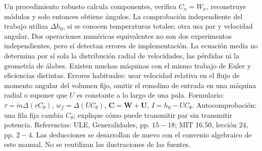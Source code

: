 \documentclass[10pt,openany]{book}
\begin{document}
Un procedimiento robusto calcula componentes, verifica \(C_x=W_x\), reconstruye módulos y solo entonces obtiene ángulos. La comprobación independiente del trabajo utiliza \(\Delta h_0\), si se conocen temperaturas totales; otra usa par y velocidad angular. Dos operaciones numéricas equivalentes no son dos experimentos independientes, pero sí detectan errores de implementación.
La ecuación media no determina por sí sola la distribución radial de velocidades, las pérdidas ni la geometría de álabes. Existen muchas máquinas con el mismo trabajo de Euler y eficiencias distintas. Errores habituales: usar velocidad relativa en el flujo de momento angular del volumen fijo, omitir el remolino de entrada en una máquina radial o suponer que \(U\) es constante a lo largo de una pala.
Formulario: \(\tau=\dot m\Delta(rC_\theta)\), \(w_f=\Delta(UC_\theta)\), \(\mathbf C=\mathbf W+\mathbf U\), \(I=h_0-UC_\theta\). Autocomprobación: una fila fija cambia \(C_\theta\); explique cómo puede transmitir par sin transmitir potencia.
Referencias: ULE, Generalidades, pp. \(15-18\); MIT 16.50, lección 24, pp. \(2-4\). Las deducciones se desarrollan de nuevo con el convenio algebraico de este manual. No se reutilizan las ilustraciones de las fuentes.
\end{document}
